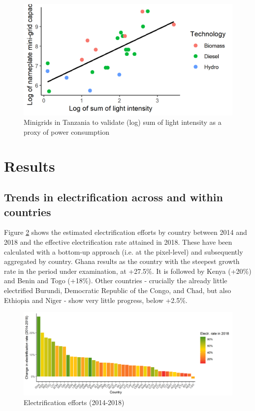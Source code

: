 \documentclass[preprint,12pt]{elsarticle}
\begin{document}
\begin{figure}[H]
    \centering
    \includegraphics{figures/mgtza.png}
    \caption{Minigrids in Tanzania to validate (log) sum of light intensity as a proxy of power consumption}
    \label{mg}
\end{figure}

\section{Results}
\subsection{Trends in electrification across and within countries}
Figure \ref{barplot} shows the estimated electrification efforts by country between 2014 and 2018 and the effective electrification rate attained in 2018. These have been calculated with a bottom-up approach (i.e. at the pixel-level) and subsequently aggregated by country. Ghana results as the country with the steepest growth rate in the period under examination, at +27.5\%. It is followed by Kenya (+20\%) and Benin and Togo (+18\%). Other countries - crucially the already little electrified Burundi, Democratic Republic of the Congo, and Chad, but also Ethiopia and Niger - show very little progress, below +2.5\%.

\begin{figure}[H]
    \centering
    \includegraphics[scale=0.7]{figures/barplot.png}
    \caption{Electrification efforts (2014-2018)}
    \label{barplot}
\end{figure}
\end{document}
